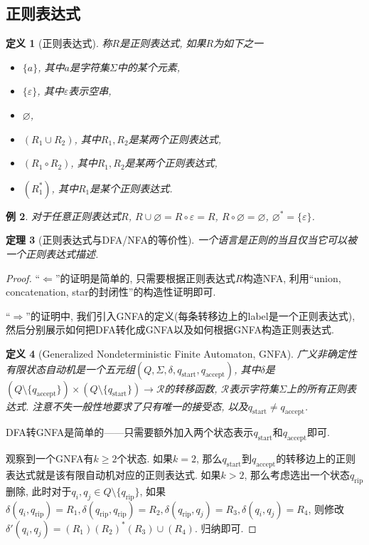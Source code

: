 \documentclass[8pt]{article}
\theoremstyle{compact}
\newtheorem{theorem}{定理}[section]
\newtheorem{definition}[theorem]{定义}
\newtheorem{example}[theorem]{例}
\def\ge{\geqslant}
\begin{document}
\subsection{正则表达式}
\begin{definition}[正则表达式]
	称$R$是正则表达式, 如果$R$为如下之一
	\begin{itemize}
		\item $\{a\}$, 其中$a$是字符集$\Sigma$中的某个元素,
		\item $\{\varepsilon\}$, 其中$\varepsilon$表示空串,
		\item $\varnothing$,
		\item $(R_1 \cup R_2)$, 其中$R_1, R_2$是某两个正则表达式,
		\item $(R_1 \circ R_2)$, 其中$R_1, R_2$是某两个正则表达式,
		\item $(R_1^*)$, 其中$R_1$是某个正则表达式.
	\end{itemize}
\end{definition}
\begin{example}
	对于任意正则表达式$R$, $R \cup \varnothing = R \circ \varepsilon = R$, $R \circ \varnothing = \varnothing$, $\varnothing^* = \{\varepsilon\}$. 
\end{example}
\begin{theorem}[正则表达式与DFA/NFA的等价性]
	一个语言是正则的当且仅当它可以被一个正则表达式描述. 
\end{theorem}
\begin{proof}
	“$\Leftarrow$”的证明是简单的, 只需要根据正则表达式$R$构造NFA, 利用“union, concatenation, star的封闭性”的构造性证明即可. 

	“$\Rightarrow$”的证明中, 我们引入GNFA的定义(每条转移边上的label是一个正则表达式), 然后分别展示如何把DFA转化成GNFA以及如何根据GNFA构造正则表达式. 

	\begin{definition}[Generalized Nondeterministic Finite Automaton, GNFA]
		广义非确定性有限状态自动机是一个五元组$(Q, \Sigma, \delta, q_{\text{start}}, q_{\text{accept}})$, 其中$\delta$是$(Q \setminus \{q_{\text{accept}}\}) \times (Q \setminus \{q_{\text{start}}\}) \to \mathcal R$的转移函数, $\mathcal R$表示字符集$\Sigma$上的所有正则表达式. 注意不失一般性地要求了只有唯一的接受态, 以及$q_{\text{start}} \neq q_{\text{accept}}$. 
	\end{definition}

	DFA转GNFA是简单的——只需要额外加入两个状态表示$q_{\text{start}}$和$q_{\text{accept}}$即可. 

	观察到一个GNFA有$k \ge 2$个状态. 如果$k=2$, 那么$q_{\text{start}}$到$q_{\text{accept}}$的转移边上的正则表达式就是该有限自动机对应的正则表达式. 如果$k > 2$, 那么考虑选出一个状态$q_{\text{rip}}$删除, 此时对于$q_i, q_j \in Q \setminus \{q_{\text{rip}}\}$, 如果$\delta(q_i,  q_{\text{rip}}) = R_1, \delta(q_{\text{rip}}, q_{\text{rip}}) = R_2, \delta(q_{\text{rip}}, q_j) = R_3, \delta(q_i, q_j) = R_4$, 则修改$\delta'(q_i, q_j) = (R_1)(R_2)^*(R_3) \cup (R_4)$. 归纳即可. 
\end{proof}
\end{document}

